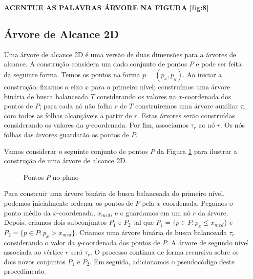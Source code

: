 \textbf{ACENTUE AS PALAVRAS \underline{ÁRVORE} NA FIGURA \ref{fig:8}}

\subsection{Árvore de Alcance 2D}

Uma árvore de alcance 2D é uma versão de duas dimensões para a árvores de alcance. A construção considera um dado conjunto de pontos $P$ e pode ser feita da seguinte forma.
Temos os pontos na forma $p = (p_x, p_y)$. Ao iniciar a construção, fixamos o eixo $x$ para o primeiro nível; construímos uma árvore binária de busca balanceada $T$ considerando os valores na $x$-coordenada dos pontos de $P$; para cada nó não folha $r$ de $T$ construiremos uma árvore auxiliar $\tau_r$ com todos as folhas alcançáveis a partir de $r$. Estas árvores serão construídas considerando os valores da $y$-coordenada. Por fim, associamos $\tau_r$ ao nó $r$. Os nós folhas das árvores guardarão os pontos de $P$.

Vamos considerar o seguinte conjunto de pontos $P$ da Figura \ref{fig:9} para ilustrar a construção de uma árvore de alcance 2D.
\begin{figure}[H]
\centering
{}
\caption{Pontos $P$ no plano}
\label{fig:9}
\end{figure}

Para construir uma árvore binária de busca balanceada do primeiro nível, podemos inicialmente ordenar os pontos de $P$ pela %
$x$-coordenada. %
Pegamos o ponto médio da $x$-coordenada, $x_{med}$, e o guardamos em um nó $r$ da árvore. Depois, criamos dois subconjuntos $P_1$ e $P_2$ tal que $P_1 = \{p \in P : p_x \leq x_{med}\}$ e $P_2 = \{p \in P : p_x > x_{med}\}$. Criamos uma árvore binária de busca balanceada $\tau_r$ considerando o valor da $y$-coordenada dos pontos de $P$. A árvore de segundo nível associada ao vértice $r$ será $\tau_r$. O processo continua de forma recursiva sobre os dois novos conjuntos $P_1$ e $P_2$. Em seguida, adicionamos o pseudocódigo deste procedimento.

